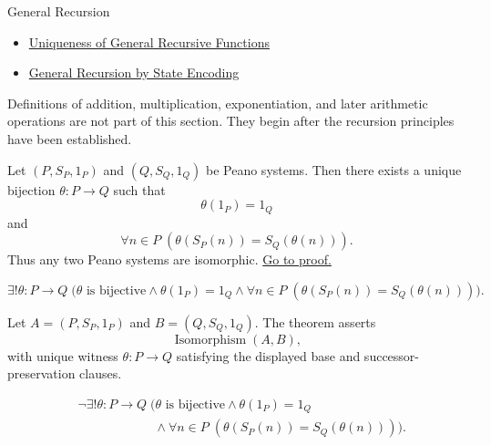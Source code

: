\begin{topicbox}{General Recursion}
\begin{dependencies}
\begin{itemize}
  \item \hyperref[lem:uniqueness-of-general-recursive-functions]{Uniqueness of General Recursive Functions}
  \item \hyperref[thm:general-recursion-by-state-encoding]{General Recursion by State Encoding}
\end{itemize}
\end{dependencies}

\begin{remark*}
Definitions of addition, multiplication, exponentiation, and later arithmetic
operations are not part of this section. They begin after the recursion
principles have been established.
\end{remark*}

\begin{tcolorbox}[colback=thmbox, colframe=thmborder, arc=2pt,
  left=6pt, right=6pt, top=4pt, bottom=4pt,
  title={\small\textbf{Theorem (Uniqueness of Peano Systems up to Isomorphism)}},
  fonttitle=\small\bfseries]
\begin{theorem}
\label{thm:uniqueness-of-peano-systems-up-to-isomorphism}
Let $(P,S_P,1_P)$ and $(Q,S_Q,1_Q)$ be Peano systems. Then there exists a
unique bijection $\theta:P\to Q$ such that
\[
\theta(1_P)=1_Q
\]
and
\[
\forall n\in P\;(\theta(S_P(n))=S_Q(\theta(n))).
\]
Thus any two Peano systems are isomorphic.
\hyperref[prf:uniqueness-of-peano-systems-up-to-isomorphism]{Go to proof.}
\end{theorem}
\end{tcolorbox}

\begin{remark*}
\[
\exists! \theta:P\to Q\;
\bigl(\theta \text{ is bijective}\land \theta(1_P)=1_Q
\land \forall n\in P\;(\theta(S_P(n))=S_Q(\theta(n)))\bigr).
\]
\end{remark*}

\begin{remark*}
Let $A=(P,S_P,1_P)$ and $B=(Q,S_Q,1_Q)$. The theorem asserts
\[
\operatorname{Isomorphism}(A,B),
\]
with unique witness $\theta:P\to Q$ satisfying the displayed base and
successor-preservation clauses.
\end{remark*}

\begin{remark*}
\[
\begin{aligned}
&\neg\exists! \theta:P\to Q\;
\bigl(\theta \text{ is bijective}\land \theta(1_P)=1_Q\\
&\qquad\qquad\qquad\land
\forall n\in P\;(\theta(S_P(n))=S_Q(\theta(n)))\bigr).
\end{aligned}
\]
\end{remark*}


\end{topicbox}
